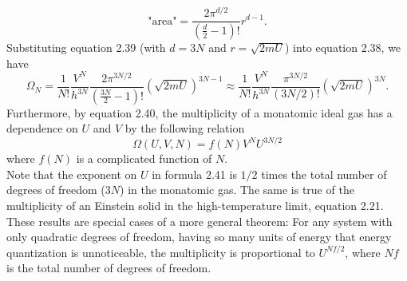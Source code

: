 \documentclass[11pt]{exam}
\begin{document}
\begin{equation}\tag{2.39}
\text{"area"}=\frac{2\pi^{d/2}}{\left(\frac{d}{2}-1\right)!}r^{d-1}.
\end{equation}
\hspace*{10mm}Substituting equation 2.39 (with $d=3N$ and $r=\sqrt{2mU}$) into equation 2.38, we have
\begin{equation}\tag{2.40}
\Omega_N = \frac{1}{N!}\frac{V^N}{h^{3N}}\frac{2\pi^{3N/2}}{\left(\frac{3N}{2}-1\right)!}(\sqrt{2mU})^{3N-1}\approx \frac{1}{N!}\frac{V^N}{h^{3N}}\frac{\pi^{3N/2}}{(3N/2)!}(\sqrt{2mU})^{3N}. 
\end{equation}
\hspace*{10mm}Furthermore, by equation 2.40, the multiplicity of a monatomic ideal gas has a dependence on $U$ and $V$ by the following relation
\begin{equation}\tag{2.41}
\Omega(U,V,N)=f(N)V^N U^{3N/2}
\end{equation}
where $f(N)$ is a complicated function of $N$.\\
\hspace*{10mm}Note that the exponent on $U$ in formula 2.41 is $1/2$ times the total number of degrees of freedom ($3N$) in the monatomic gas. The same is true of the multiplicity of an Einstein solid in the high-temperature limit, equation 2.21. These results are special cases of a more general theorem: For any system with only quadratic degrees of freedom, having so many units of energy that energy quantization is unnoticeable, the multiplicity is proportional to $U^{Nf/2}$, where $Nf$ is the total number of degrees of freedom.
\newpage
\end{document}
